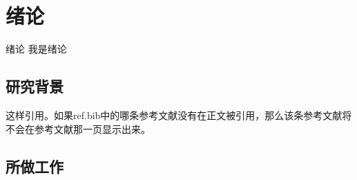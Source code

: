 \chapter{绪论}{绪论}    %
我是绪论
\section{研究背景}
这样引用\cite{bierlich2022comprehensive}。如果ref.bib中的哪条参考文献没有在正文被引用，那么该条参考文献将不会在参考文献那一页显示出来。
\section{所做工作}